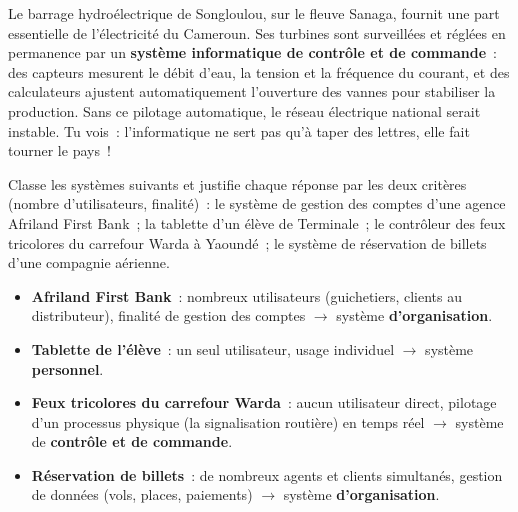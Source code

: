 \documentclass[11pt]{article}
\begin{document}
\begin{savaistu}
Le barrage hydroélectrique de Songloulou, sur le fleuve Sanaga, fournit une part essentielle de l'électricité du Cameroun. Ses turbines sont surveillées et réglées en permanence par un \textbf{système informatique de contrôle et de commande}~: des capteurs mesurent le débit d'eau, la tension et la fréquence du courant, et des calculateurs ajustent automatiquement l'ouverture des vannes pour stabiliser la production. Sans ce pilotage automatique, le réseau électrique national serait instable. Tu vois~: l'informatique ne sert pas qu'à taper des lettres, elle fait tourner le pays~!
\end{savaistu}

\begin{exercice}
Classe les systèmes suivants et justifie chaque réponse par les deux critères (nombre d'utilisateurs, finalité)~: le système de gestion des comptes d'une agence Afriland First Bank~; la tablette d'un élève de Terminale~; le contrôleur des feux tricolores du carrefour Warda à Yaoundé~; le système de réservation de billets d'une compagnie aérienne.
\end{exercice}

\begin{corrige}[Exercice 1]
\begin{itemize}
  \item \textbf{Afriland First Bank}~: nombreux utilisateurs (guichetiers, clients au distributeur), finalité de gestion des comptes $\rightarrow$ système \textbf{d'organisation}.
  \item \textbf{Tablette de l'élève}~: un seul utilisateur, usage individuel $\rightarrow$ système \textbf{personnel}.
  \item \textbf{Feux tricolores du carrefour Warda}~: aucun utilisateur direct, pilotage d'un processus physique (la signalisation routière) en temps réel $\rightarrow$ système de \textbf{contrôle et de commande}.
  \item \textbf{Réservation de billets}~: de nombreux agents et clients simultanés, gestion de données (vols, places, paiements) $\rightarrow$ système \textbf{d'organisation}.
\end{itemize}
\end{corrige}
\end{document}
